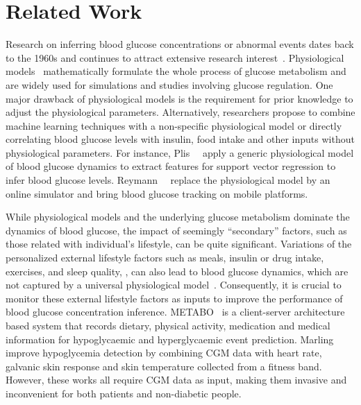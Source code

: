 \section{Related Work}
\label{sec:relwork}
Research on inferring blood glucose concentrations or abnormal events dates back to the 1960s and continues to attract extensive research interest~\cite{bib:IJNMBE16:Oviedo}.
Physiological models~\cite{bib:TBE07:Dalla, bib:PE04:Hovorka} mathematically formulate the whole process of glucose metabolism and are widely used for simulations and studies involving glucose regulation.
One major drawback of physiological models is the requirement for prior knowledge to adjust the physiological parameters.
Alternatively, researchers propose to combine machine learning techniques with a non-specific physiological model or directly correlating blood glucose levels with insulin, food intake and other inputs without physiological parameters.
For instance, Plis~\etal~\cite{bib:MAIHA14:Plis} apply a generic physiological model of blood glucose dynamics to extract features for support vector regression to infer blood glucose levels.
Reymann~\etal~\cite{bib:EMBC16:Reymann} replace the physiological model by an online simulator and bring blood glucose tracking on mobile platforms.

While physiological models and the underlying glucose metabolism dominate the dynamics of blood glucose, the impact of seemingly ``secondary'' factors, such as those related with individual's lifestyle, can be quite significant.
Variations of the personalized external lifestyle factors such as meals, insulin or drug intake, exercises, and sleep quality, \etc, can also lead to blood glucose dynamics, which are not captured by a universal physiological model~\cite{bib:DRCP15:Iwasaki}.
Consequently, it is crucial to monitor these external lifestyle factors as inputs to improve the performance of blood glucose concentration inference.
METABO~\cite{bib:EMBC09:Georga} is a client-server architecture based system that records dietary, physical activity, medication and medical information for hypoglycaemic and hyperglycaemic event prediction.
Marling~\etal~\cite{bib:KDHealth16:Marling} improve hypoglycemia detection by combining CGM data with heart rate, galvanic skin response and skin temperature collected from a fitness band.
However, these works all require CGM data as input, making them invasive and inconvenient for both patients and non-diabetic people.

